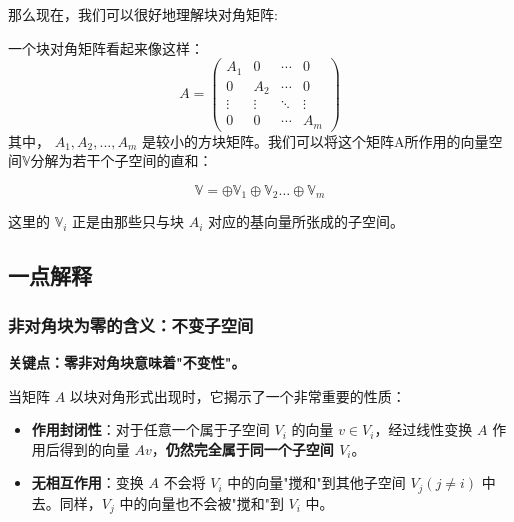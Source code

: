 那么现在，我们可以很好地理解块对角矩阵:\par
一个块对角矩阵看起来像这样：
\begin{equation}
	A = \begin{pmatrix}
		A_1 & 0 & \cdots & 0 \\
		0 & A_2 & \cdots & 0 \\
		\vdots & \vdots & \ddots & \vdots \\
		0 & 0 & \cdots & A_m
	\end{pmatrix}
\end{equation}
其中， $A_1, A_2, ..., A_m$  是较小的方块矩阵。我们可以将这个矩阵A所作用的向量空间$\mathbb{V}$分解为若干个子空间的直和：

\begin{equation}
	\mathbb{V} =\oplus \mathbb{V}_1 \oplus \mathbb{V}_2 \ldots \oplus \mathbb{V}_m
\end{equation}

这里的  $\mathbb{V}_i$  正是由那些只与块  $A_i $ 对应的基向量所张成的子空间。\par
\subsection{一点解释}
\subsubsection{非对角块为零的含义：不变子空间}

\textbf{关键点：零非对角块意味着"不变性"。}

当矩阵 \( A \) 以块对角形式出现时，它揭示了一个非常重要的性质：

\begin{itemize}
	\item \textbf{作用封闭性}：对于任意一个属于子空间 \( V_i \) 的向量 \( v \in V_i \)，经过线性变换 \( A \) 作用后得到的向量 \( Av \)，\textbf{仍然完全属于同一个子空间 \( V_i \)}。
	\item \textbf{无相互作用}：变换 \( A \) 不会将 \( V_i \) 中的向量"搅和"到其他子空间 \( V_j (j \neq i) \) 中去。同样，\( V_j \) 中的向量也不会被"搅和"到 \( V_i \) 中。
\end{itemize}
